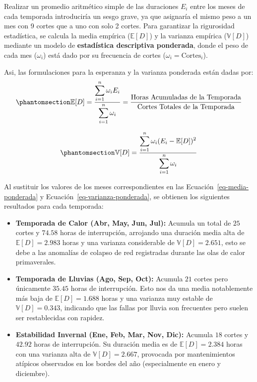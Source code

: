 \documentclass[
  spanish,
  us-letterpaper,
]{scrreprt}
\providecommand{\tightlist}{%
  \setlength{\itemsep}{0pt}\setlength{\parskip}{0pt}}
\numberwithin{equation}{section}
\theoremstyle{plain}
\theoremstyle{plain}
\theoremstyle{definition}
\theoremstyle{plain}
\theoremstyle{remark}
\begin{document}
Realizar un promedio aritmético simple de las duraciones \(E_i\) entre
los meses de cada temporada introduciría un sesgo grave, ya que
asignaría el mismo peso a un mes con 9 cortes que a uno con solo 2
cortes. Para garantizar la rigurosidad estadística, se calcula la media
empírica (\(\mathbb{E}[D]\)) y la varianza empírica (\(\mathbb{V}[D]\))
mediante un modelo de \textbf{estadística descriptiva ponderada}, donde
el peso de cada mes (\(\omega_i\)) está dado por su frecuencia de cortes
(\(\omega_i = \text{Cortes}_i\)).

Asi, las formulaciones para la esperanza y la varianza ponderada están
dadas por: \begin{equation}\phantomsection\label{eq-media-ponderada}{
\displaystyle \mathbb{E}[D] = \displaystyle \dfrac{\displaystyle \sum_{i=1}^{n} \omega_i E_i}{\displaystyle \sum_{i=1}^{n} \omega_i} = \frac{\text{Horas Acumuladas de la Temporada}}{\text{Cortes Totales de la Temporada}}
}\end{equation}

\begin{equation}\phantomsection\label{eq-varianza-ponderada}{
\displaystyle \mathbb{V}[D] = \displaystyle \frac{\displaystyle \sum_{i=1}^{n} \omega_i (E_i - \mathbb{E}[D])^2}{\displaystyle \sum_{i=1}^{n} \omega_i}
}\end{equation}

Al sustituir los valores de los meses correspondientes en las
Ecuación~\ref{eq-media-ponderada} y
Ecuación~\ref{eq-varianza-ponderada}, se obtienen los siguientes
resultados para cada temporada:

\begin{itemize}
\tightlist
\item
  \textbf{Temporada de Calor (Abr, May, Jun, Jul):} Acumula un total de
  \(25\) cortes y \(74.58\) horas de interrupción, arrojando una
  duración media alta de \(\mathbb{E}[D] = 2.983\) horas y una varianza
  considerable de \(\mathbb{V}[D] = 2.651\), esto se debe a las
  anomalías de colapso de red registradas durante las olas de calor
  primaverales.
\item
  \textbf{Temporada de Lluvias (Ago, Sep, Oct):} Acumula \(21\) cortes
  pero únicamente \(35.45\) horas de interrupción. Esto nos da una media
  notablemente más baja de \(\mathbb{E}[D] = 1.688\) horas y una
  varianza muy estable de \(\mathbb{V}[D] = 0.343\), indicando que las
  fallas por lluvia son frecuentes pero suelen ser restablecidas con
  rapidez.
\item
  \textbf{Estabilidad Invernal (Ene, Feb, Mar, Nov, Dic):} Acumula
  \(18\) cortes y \(42.92\) horas de interrupción. Su duración media es
  de \(\mathbb{E}[D] = 2.384\) horas con una varianza alta de
  \(\mathbb{V}[D] = 2.667\), provocada por mantenimientos atípicos
  observados en los bordes del año (especialmente en enero y diciembre).
\end{itemize}
\end{document}
